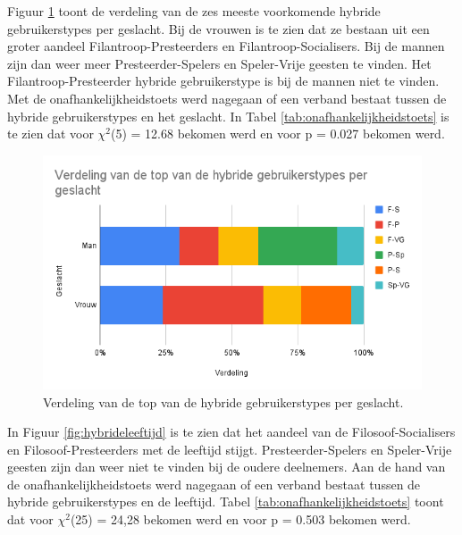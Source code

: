 Figuur \ref{fig:hybridegeslacht} toont de verdeling van de zes meeste voorkomende hybride gebruikerstypes per geslacht. Bij de vrouwen is te zien dat ze bestaan uit een groter aandeel Filantroop-Presteerders en Filantroop-Socialisers. Bij de mannen zijn dan weer meer Presteerder-Spelers en Speler-Vrije geesten te vinden. Het Filantroop-Presteerder hybride gebruikerstype is bij de mannen niet te vinden. Met de onafhankelijkheidstoets werd nagegaan of een verband bestaat tussen de hybride gebruikerstypes en het geslacht. In Tabel \ref{tab:onafhankelijkheidstoets} is te zien dat voor $\chi^2$(5) = 12.68 bekomen werd en voor p = 0.027 bekomen werd.

\begin{figure}
    \includegraphics[width=\linewidth]{HybrideGeslacht.png}
    \caption{Verdeling van de top van de hybride gebruikerstypes per geslacht.}
    \label{fig:hybridegeslacht}
\end{figure}

In Figuur \ref{fig:hybrideleeftijd} is te zien dat het aandeel van de Filosoof-Socialisers en Filosoof-Presteerders met de leeftijd stijgt. Presteerder-Spelers en Speler-Vrije geesten zijn dan weer niet te vinden bij de oudere deelnemers. Aan de hand van de onafhankelijkheidstoets werd nagegaan of een verband bestaat tussen de hybride gebruikerstypes en de leeftijd. Tabel \ref{tab:onafhankelijkheidstoets} toont dat voor $\chi^2$(25) = 24,28 bekomen werd en voor p = 0.503 bekomen werd.

